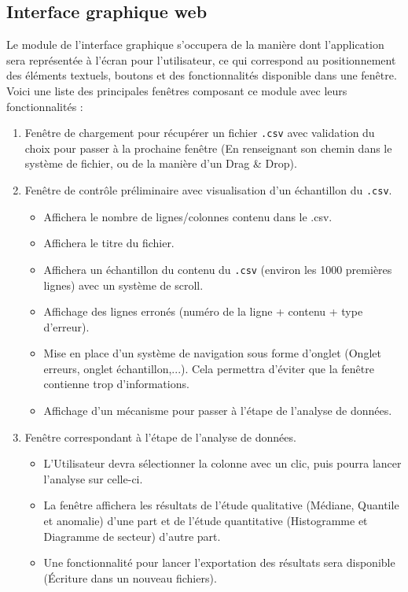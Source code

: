 		\subsection{Interface graphique web}
			Le module de l'interface graphique s'occupera de la manière dont l'application sera représentée à l'écran pour l'utilisateur, ce qui correspond au positionnement des éléments textuels, boutons et des fonctionnalités disponible dans une fenêtre. Voici une liste des principales fenêtres composant ce module avec leurs fonctionnalités :
			\begin{enumerate}
			\item Fenêtre de chargement pour récupérer un fichier \lstinline!.csv! avec validation du choix pour passer à la prochaine fenêtre (En renseignant son chemin dans le système de fichier, ou de la manière d'un Drag \& Drop).
			\item Fenêtre de contrôle préliminaire avec visualisation d'un échantillon du \lstinline!.csv!.		
				\begin{itemize}
				\item Affichera le nombre de lignes/colonnes contenu dans le .csv.
				\item Affichera le titre du fichier.
				\item Affichera un échantillon du contenu du \lstinline!.csv! (environ les 1000 premières lignes) avec un système de scroll.
				\item Affichage des lignes erronés (numéro de la ligne + contenu + type d'erreur).
				\item Mise en place d'un système de navigation sous forme d'onglet (Onglet erreurs, onglet échantillon,...). Cela permettra d'éviter que la fenêtre contienne trop d'informations.
				\item Affichage d'un mécanisme pour passer à l'étape de l'analyse de données.
				\end{itemize}
			\item Fenêtre correspondant à l'étape de l'analyse de données.
				\begin{itemize}
				\item L'Utilisateur devra sélectionner la colonne avec un clic, puis pourra lancer l'analyse sur celle-ci.
				\item La fenêtre affichera les résultats de l'étude qualitative (Médiane, Quantile et anomalie) d'une part et de l'étude quantitative (Histogramme et Diagramme de secteur) d'autre part.
				\item Une fonctionnalité pour lancer l'exportation des résultats sera disponible (Écriture dans un nouveau fichiers).
				\end{itemize}
			\end{enumerate}
		
